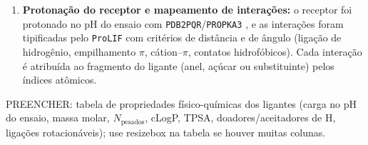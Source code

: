 \begin{enumerate}
    \item \textbf{Protonação do receptor e mapeamento de interações:} o receptor foi protonado no pH do ensaio com \texttt{PDB2PQR}/\texttt{PROPKA3} \cite{Olsson2011PROPKA3, Jurrus2018PDB2PQR}, e as interações foram tipificadas pelo \texttt{ProLIF} \cite{Bouysset2021ProLIF} com critérios de distância e de ângulo (ligação de hidrogênio, empilhamento $\pi$, cátion--$\pi$, contatos hidrofóbicos). Cada interação é atribuída ao fragmento do ligante (anel, açúcar ou substituinte) pelos índices atômicos.
\end{enumerate}

PREENCHER: tabela de propriedades físico-químicas dos ligantes (carga no pH do ensaio, massa molar, $N_{\text{pesados}}$, cLogP, TPSA, doadores/aceitadores de H, ligações rotacionáveis); use resizebox na tabela se houver muitas colunas.
